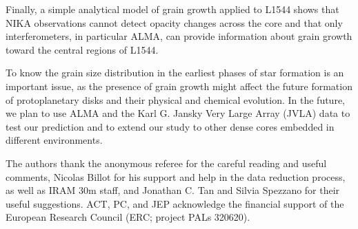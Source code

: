 \documentclass{aa}
\begin{document}
Finally, a simple analytical model of grain growth applied to L1544 shows that NIKA observations cannot detect opacity changes across the core and that only interferometers, in particular ALMA, can provide information about grain growth toward the central regions of L1544. 

To know the grain size distribution in the earliest phases of star formation is an important issue, as the presence of grain growth might affect the future formation of protoplanetary disks and their physical and chemical evolution. In the future, we plan to use ALMA and the Karl G. Jansky Very Large Array (JVLA) data to test our prediction and to extend our study to other dense cores embedded in different environments.

\begin{acknowledgements}

The authors thank the anonymous referee for the careful reading and useful comments, Nicolas Billot for his support and help in the data reduction process, as well as IRAM 30m staff, and Jonathan C. Tan and Silvia Spezzano for their useful suggestions. ACT, PC, and JEP acknowledge the financial support of the European Research Council (ERC; project PALs 320620).

\end{acknowledgements}


\end{document}
